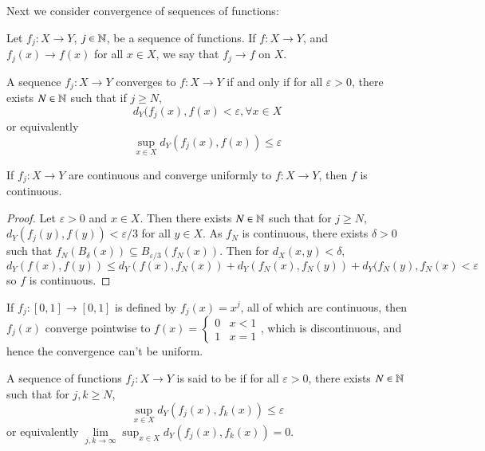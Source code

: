 Next we consider convergence of sequences of functions: 

\begin{defn}
    Let $f_j:X\rightarrow Y$, $j \in \mathbb N$, be a sequence of functions. If $f:X\rightarrow Y$, and $f_j(x)\rightarrow f(x)$ for all $x \in X$, we say that $f_j\rightarrow f$  on $X$.
\end{defn}

\begin{defn}
    A sequence $f_j:X\rightarrow Y$ converges  to $f:X\rightarrow Y$ if and only if for all $\varepsilon > 0$, there exists $N \in \mathbb N$ such that if $j \geq N$, $$d_Y(f_j(x),f(x) < \varepsilon,\forall x \in X$$ or equivalently $$\sup_{x \in X}d_Y(f_j(x),f(x)) \leq \varepsilon$$
\end{defn}

\begin{prop}\label{prop:3.2.1}
    If $f_j:X\rightarrow Y$ are continuous and converge uniformly to $f:X\rightarrow Y$, then $f$ is continuous.
\end{prop}
\begin{proof}
    Let $\varepsilon > 0$ and $x \in X$. Then there exists $N \in \mathbb N$ such that for $j \geq N$, $d_Y(f_j(y),f(y)) < \varepsilon/3$ for all $y \in X$. As $f_N$ is continuous, there exists $\delta > 0$ such that $f_N(B_{\delta}(x)) \subseteq B_{\varepsilon/3}(f_N(x))$. Then for $d_X(x,y) < \delta$, $$d_Y(f(x),f(y)) \leq d_Y(f(x),f_N(x)) + d_Y(f_N(x),f_N(y)) + d_Y(f_N(y),f_N(x) < \varepsilon$$ so $f$ is continuous.
\end{proof}

\begin{eg}
    If $f_j:[0,1]\rightarrow [0,1]$ is defined by $f_j(x) = x^j$, all of which are continuous, then $f_j(x)$ converge pointwise to $f(x) = \left\{\begin{array}{cc} 0 & x < 1 \\ 1 & x = 1\end{array}\right.$, which is discontinuous, and hence the convergence can't be uniform.
\end{eg}

\begin{defn}
    A sequence of functions $f_j:X\rightarrow Y$ is said to be  if for all $\varepsilon > 0$, there exists $N \in \mathbb N$ such that for $j,k\geq N$, $$\sup_{x\in X}d_Y(f_j(x),f_k(x)) \leq \varepsilon$$ or equivalently $\lim\limits_{j,k\rightarrow \infty}\sup_{x\in X}d_Y(f_j(x),f_k(x))  = 0$.
\end{defn}

